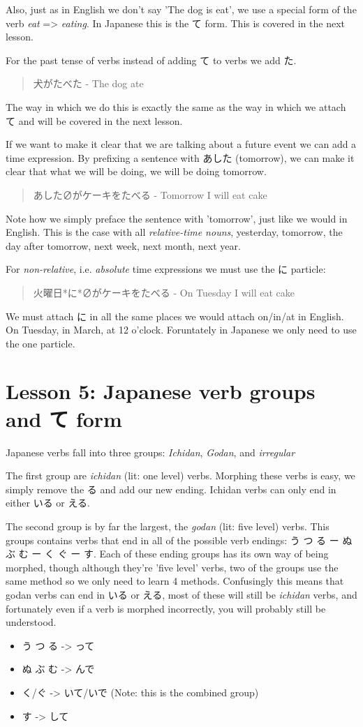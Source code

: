 \documentclass[11pt]{article}
\begin{document}
Also, just as in English we don't say 'The dog is eat', we use a special form of the verb \emph{eat} => \emph{eating}. In Japanese this is the て form. This is covered in the next lesson.

For the past tense of verbs instead of adding て to verbs we add た.
\begin{quote}
犬がたべた - The dog ate
\end{quote}
The way in which we do this is exactly the same as the way in which we attach て and will be covered in the next lesson.

If we want to make it clear that we are talking about a future event we can add a time expression. By prefixing a sentence with あした (tomorrow), we can make it clear that what we will be doing, we will be doing tomorrow.
\begin{quote}
あした∅がケーキをたべる - Tomorrow I will eat cake
\end{quote}
Note how we simply preface the sentence with 'tomorrow', just like we would in English. This is the case with all \emph{relative-time nouns}, yesterday, tomorrow, the day after tomorrow, next week, next month, next year.

For \emph{non-relative}, i.e. \emph{absolute} time expressions we must use the に particle:
\begin{quote}
火曜日*に*∅がケーキをたべる - On Tuesday I will eat cake
\end{quote}
We must attach に in all the same places we would attach on/in/at in English. On Tuesday, in March, at 12 o'clock. Foruntately in Japanese we only need to use the one particle.


\section{Lesson 5: Japanese verb groups and て form}
\label{sec:org75f7203}
Japanese verbs fall into three groups: \emph{Ichidan}, \emph{Godan}, and \emph{irregular}

The first group are \emph{ichidan} (lit: one level) verbs. Morphing these verbs is easy, we simply remove the る and add our new ending. Ichidan verbs can only end in either いる or える.

The second group is by far the largest, the \emph{godan} (lit: five level) verbs. This groups contains verbs that end in all of the possible verb endings: う つ る ー ぬ ぶ む ー く ぐ ー す. Each of these ending groups has its own way of being morphed, though although they're 'five level' verbs, two of the groups use the same method so we only need to learn 4 methods. Confusingly this means that godan verbs can end in いる or える, most of these will still be \emph{ichidan} verbs, and fortunately even if a verb is morphed incorrectly, you will probably still be understood.
\begin{itemize}
\item う つ る -> って
\item ぬ ぶ む -> んで
\item く/ぐ -> いて/いで (Note: this is the combined group)
\item す -> して
\end{itemize}
\end{document}
